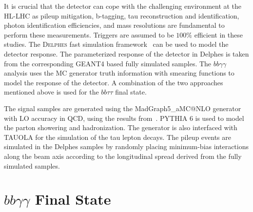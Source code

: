 It is crucial that the \phasetwo detector can cope with the challenging environment at the HL-LHC as pileup mitigation, b-tagging, tau reconstruction and identification, photon identification efficiencies, and mass  resolutions are fundamental to perform these measurements. Triggers are assumed to be $100\%$ efficient in these studies. The \textsc{Delphes} fast simulation framework~\cite{deFavereau:2013fsa} can be used to model the \phasetwo detector response. The parameterized response of the \phasetwo detector in Delphes is taken from the corresponding GEANT4 based fully simulated samples. The $bb\gamma\gamma$ analysis uses the MC generator truth information with smearing functions to model the response of the detector. A combination of the two approaches mentioned above is used for the $bb\tau\tau$ final state.  

The signal samples are generated using the MadGraph5\_aMC@NLO generator with LO accuracy in QCD, using the results from~\cite{Frederix2014142}. PYTHIA 6 is used to model the parton showering and hadronization. The generator is also interfaced with TAUOLA for the simulation of the tau lepton decays. The pileup events are simulated in the Delphes samples by randomly placing minimum-bias interactions along the beam axis according to the longitudinal spread derived from the fully simulated samples.

\section{$bb\gamma\gamma$ Final State}

